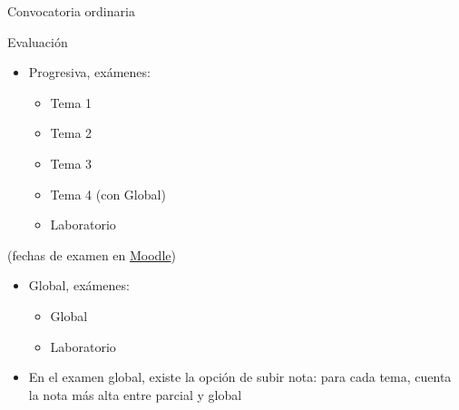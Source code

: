 \documentclass[aspectratio=169, usenames,svgnames,dvipsnames]{beamer}
\begin{document}
\begin{frame}{Convocatoria ordinaria}

    \begin{minipage}[t]{0.34\linewidth}
    \alert{Evaluación}
    \vspace{3mm}
    \begin{itemize}
    \item \alert{Progresiva}, exámenes:
        \begin{itemize}
        \item Tema 1
        \item Tema 2
        \item Tema 3
        \item Tema 4 (con Global)
        \item Laboratorio
        \end{itemize}
    \end{itemize}
    (fechas de examen en \href{https://moodle.upm.es/titulaciones/oficiales/course/view.php?id=1218\#section-1}{Moodle})
    \begin{itemize}
    \item \alert{Global}, exámenes:
        \begin{itemize}
        \item Global
        \item Laboratorio
        \end{itemize}
    \end{itemize}
    \end{minipage}
    \hfill%
    \begin{minipage}[t]{0.65\linewidth}
    \vspace{13.2mm}
        \begin{itemize}
        \vspace{33mm}
        
        \item En el examen global, existe la \alert{opción de subir nota}: para cada tema, cuenta la nota más alta entre parcial y global
        \end{itemize}    
    \end{minipage}

\end{frame}
\end{document}
